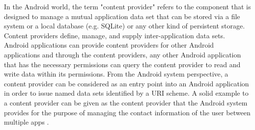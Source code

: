 In the Android world, the term "content provider" refers to the component that is designed to manage a mutual application data set that can be stored via a file system or a local database (e.g. SQLite) or any other kind of persistent storage. Content providers define, manage, and supply inter-application data sets. Android applications can provide content providers for other Android applications and through the content providers, any other Android application that has the necessary permissions can query the content provider to read and write data within its permissions. From the Android system perspective, a content provider can be considered as an entry point into an Android application in order to issue named data sets identified by a URI scheme. A solid example to a content provider can be given as the content provider that the Android system provides for the purpose of managing the contact information of the user between multiple apps \cite{9}.